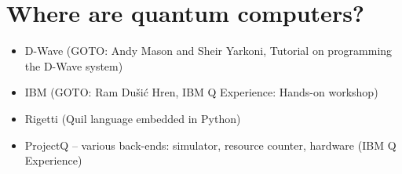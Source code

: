 \documentclass{beamer}
\begin{document}
\begin{frame}{\insertsection}{\insertsubsection}
	
\end{frame}

\section{Where are quantum computers?}

\begin{frame}{\insertsection}
	\begin{itemize}
		\item D-Wave (GOTO: Andy Mason and Sheir Yarkoni, Tutorial on 
		programming the D-Wave system) 
		\item IBM (GOTO: Ram Du\v{s}i\'c Hren, IBM Q Experience: Hands-on 
		workshop)
		\item Rigetti (Quil language embedded in Python)
		\item ProjectQ -- various back-ends: simulator, resource counter, 
		hardware (IBM Q Experience)
	\end{itemize}
\end{frame}
\end{document}
